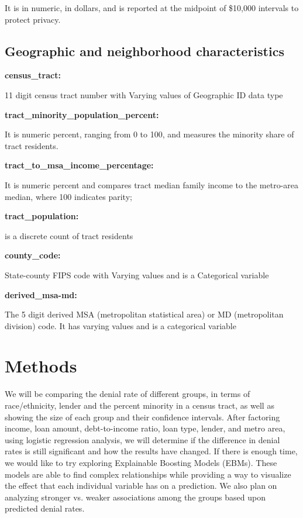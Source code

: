 \documentclass[manuscript,authorversion,nonacm]{acmart}
\begin{document}
It is in numeric, in dollars, and is reported at the midpoint of \$10,000 intervals to protect privacy.

\subsection{Geographic and neighborhood characteristics}

\noindent\textbf{census\_tract:}

11 digit census tract number with Varying values of Geographic ID data type

\noindent\textbf{tract\_minority\_population\_percent:}

It is numeric percent, ranging from 0 to 100, and measures the minority share of tract residents.

\noindent\textbf{tract\_to\_msa\_income\_percentage:}

It is numeric percent and compares tract median family income to the metro-area median, where 100 indicates parity;

\noindent\textbf{tract\_population:}

is a discrete count of tract residents

\noindent\textbf{county\_code:}

State-county FIPS code with Varying values and is a Categorical variable

\noindent\textbf{derived\_msa-md:}

The 5 digit derived MSA (metropolitan statistical area) or MD (metropolitan division) code. It has varying values and is a categorical variable

\section{Methods}

We will be comparing the denial rate of different groups, in terms of race/ethnicity, lender and the percent minority in a census tract, as well as showing the size of each group and their confidence intervals. After factoring income, loan amount, debt-to-income ratio, loan type, lender, and metro area, using logistic regression analysis, we will determine if the difference in denial rates is still significant and how the results have changed. If there is enough time, we would like to try exploring Explainable Boosting Models (EBMs). These models are able to find complex relationships while providing a way to visualize the effect that each individual variable has on a prediction. We also plan on analyzing stronger vs. weaker associations among the groups based upon predicted denial rates.
\end{document}
